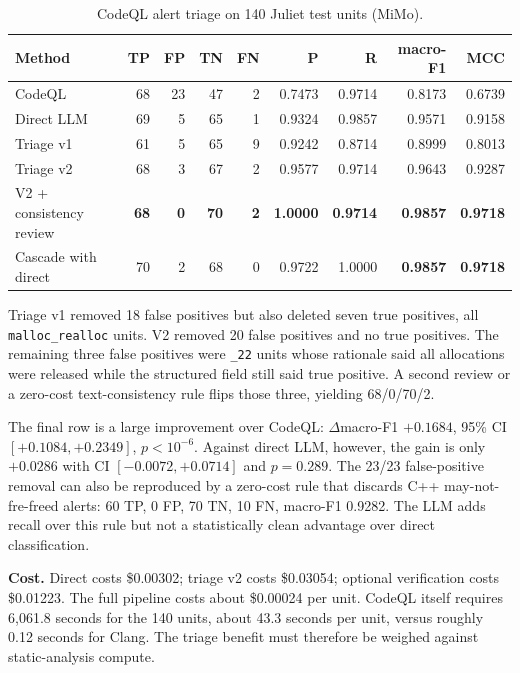 \documentclass[conference]{IEEEtran}
\newcommand{\best}[1]{\textbf{#1}}
\begin{document}
\begin{table}[t]
\centering
\caption{CodeQL alert triage on 140 Juliet test units (MiMo).}
\label{tab:triage}
\footnotesize
\setlength{\tabcolsep}{4pt}
\begin{tabular}{@{}lrrrrrrrr@{}}
\toprule
Method & TP & FP & TN & FN & P & R & macro-F1 & MCC \\
\midrule
CodeQL & 68 & 23 & 47 & 2 & 0.7473 & 0.9714 & 0.8173 & 0.6739 \\
Direct LLM & 69 & 5 & 65 & 1 & 0.9324 & 0.9857 & 0.9571 & 0.9158 \\
Triage v1 & 61 & 5 & 65 & 9 & 0.9242 & 0.8714 & 0.8999 & 0.8013 \\
Triage v2 & 68 & 3 & 67 & 2 & 0.9577 & 0.9714 & 0.9643 & 0.9287 \\
V2 + consistency review & \best{68} & \best{0} & \best{70} & \best{2} & \best{1.0000} & \best{0.9714} & \best{0.9857} & \best{0.9718} \\
Cascade with direct & 70 & 2 & 68 & 0 & 0.9722 & 1.0000 & \best{0.9857} & \best{0.9718} \\
\bottomrule
\end{tabular}
\end{table}

Triage v1 removed 18 false positives but also deleted seven true positives, all \texttt{malloc\_realloc} units. V2 removed 20 false positives and no true positives. The remaining three false positives were \texttt{\_22} units whose rationale said all allocations were released while the structured field still said true positive. A second review or a zero-cost text-consistency rule flips those three, yielding 68/0/70/2.

The final row is a large improvement over CodeQL: $\Delta$macro-F1 $+0.1684$, 95\% CI $[+0.1084,+0.2349]$, $p<10^{-6}$. Against direct LLM, however, the gain is only $+0.0286$ with CI $[-0.0072,+0.0714]$ and $p=0.289$. The 23/23 false-positive removal can also be reproduced by a zero-cost rule that discards C++ may-not-fre-freed alerts: 60 TP, 0 FP, 70 TN, 10 FN, macro-F1 0.9282. The LLM adds recall over this rule but not a statistically clean advantage over direct classification.

\textbf{Cost.} Direct costs \$0.00302; triage v2 costs \$0.03054; optional verification costs \$0.01223. The full pipeline costs about \$0.00024 per unit. CodeQL itself requires 6,061.8 seconds for the 140 units, about 43.3 seconds per unit, versus roughly 0.12 seconds for Clang. The triage benefit must therefore be weighed against static-analysis compute.
\end{document}
